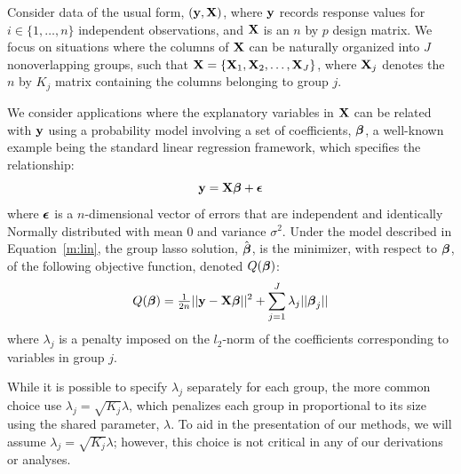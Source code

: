 Consider data of the usual form, $(\mathbf{y}, \mathbf{X})$, where $\mathbf{y}$ records response values for $i \in \{1, \ldots, n\}$ independent observations, and $\mathbf{X}$ is an $n$ by $p$ design matrix. We focus on situations where the columns of $\mathbf{X}$ can be naturally organized into $J$ nonoverlapping groups, such that $\mathbf{X} = \{\mathbf{X}_1, \mathbf{X}_2, \ldots, \mathbf{X}_J\}$, where $\mathbf{X}_j$ denotes the $n$ by $K_j$ matrix containing the columns belonging to group $j$. 

We consider applications where the explanatory variables in $\mathbf{X}$ can be related with $\mathbf{y}$ using a probability model involving a set of coefficients, $\boldsymbol{\beta}$, a well-known example being the standard linear regression framework, which specifies the relationship:
\begin{equation}
\label{m:lin}
\mathbf{y} = \mathbf{X}\boldsymbol{\beta} + \boldsymbol{\epsilon}
\end{equation}
where $\boldsymbol{\epsilon}$ is a $n$-dimensional vector of errors that are independent and identically Normally distributed with mean 0 and variance $\sigma^2$. 
Under the model described in Equation~\ref{m:lin}, the group lasso solution, $\hat{\boldsymbol{\beta}}$, is the minimizer, with respect to $\boldsymbol{\beta}$, of the following objective function, denoted $Q(\boldsymbol{\beta})$:
\begin{equation}
Q(\boldsymbol{\beta}) = \tfrac{1}{2n}||\mathbf{y} - \mathbf{X}\boldsymbol{\beta}||^2 + \sum_{j = 1}^{J}\lambda_j ||\boldsymbol{\beta}_j||
\end{equation}
where $\lambda_j$ is a penalty imposed on the $l_2$-norm of the coefficients corresponding to variables in group $j$. 

While it is possible to specify $\lambda_j$ separately for each group, the more common choice use $\lambda_j = \sqrt{K_j}\lambda$, which penalizes each group in proportional to its size using the shared parameter, $\lambda$. To aid in the presentation of our methods, we will assume $\lambda_j = \sqrt{K_j}\lambda$; however, this choice is not critical in any of our derivations or analyses.

